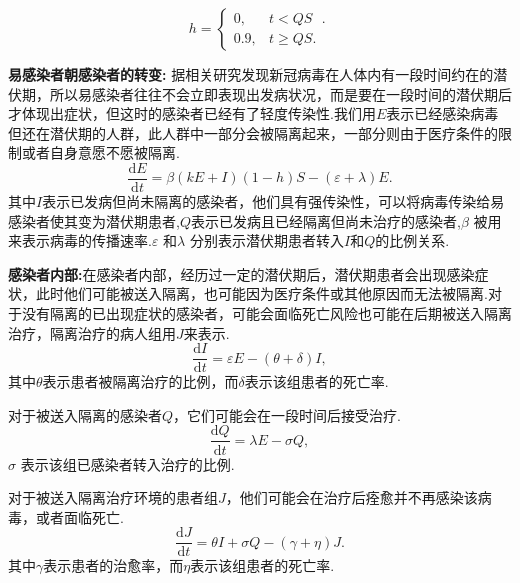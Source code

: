 \documentclass{whutmod}
\begin{document}
\begin{equation}
	h=\begin{cases}
		0,&\text{$t<QS$ }.\\
		0.9,& \text{$t \ge QS$}.
		\end{cases}
\end{equation}

\textbf{易感染者朝感染者的转变:}
据相关研究发现新冠病毒在人体内有一段时间约在的潜伏期，所以易感染者往往不会立即表现出发病状况，而是要在一段时间的潜伏期后才体现出症状，但这时的感染者已经有了轻度传染性.我们用$E$表示已经感染病毒但还在潜伏期的人群，此人群中一部分会被隔离起来，一部分则由于医疗条件的限制或者自身意愿不愿被隔离.
\begin{equation}
 \frac{\mathrm{d}E}{\mathrm{d}t}=\beta(kE+I)(1-h)S-(\varepsilon+\lambda)E.
\end{equation}
其中$I$表示已发病但尚未隔离的感染者，他们具有强传染性，可以将病毒传染给易感染者使其变为潜伏期患者,$Q$表示已发病且已经隔离但尚未治疗的感染者,$\beta$ 被用来表示病毒的传播速率.$\varepsilon$ 和$\lambda$ 分别表示潜伏期患者转入$I$和$Q$的比例关系.
\quad

\textbf{感染者内部:}在感染者内部，经历过一定的潜伏期后，潜伏期患者会出现感染症状，此时他们可能被送入隔离，也可能因为医疗条件或其他原因而无法被隔离.对于没有隔离的已出现症状的感染者，可能会面临死亡风险也可能在后期被送入隔离治疗，隔离治疗的病人组用$J$来表示.
\begin{equation}
\frac{\mathrm{d}I}{\mathrm{d}t}=\varepsilon E-(\theta+\delta)I,
\end{equation}
其中$\theta$表示患者被隔离治疗的比例，而$\delta$表示该组患者的死亡率.

对于被送入隔离的感染者$Q$，它们可能会在一段时间后接受治疗.
\begin{equation}
\frac{\mathrm{d}Q}{\mathrm{d}t}=\lambda E-\sigma Q,
\end{equation}
$\sigma$ 表示该组已感染者转入治疗的比例.

对于被送入隔离治疗环境的患者组$J$，他们可能会在治疗后痊愈并不再感染该病毒，或者面临死亡.
\begin{equation}
\frac{\mathrm{d}J}{\mathrm{d}t}=\theta I+\sigma Q-(\gamma+\eta)J.
\end{equation}
其中$\gamma$表示患者的治愈率，而$\eta$表示该组患者的死亡率.
\end{document}
